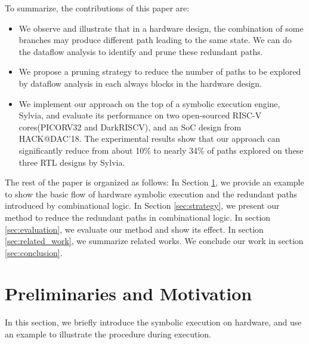 \documentclass[conference]{IEEEtran}
\begin{document}
To summarize, the contributions of this paper are:
\begin{itemize}[itemsep=1pt, topsep=1pt, parsep=0pt,leftmargin=*]

\item We observe and illustrate that in a hardware design, the combination of some branches may produce different path leading to the same state. We can do the dataflow analysis to identify and prune these redundant paths.
\item We propose a pruning strategy to reduce the number of paths to be explored by dataflow analysis in each always blocks in the hardware design.
\item We implement our approach on the top of a symbolic execution engine, Sylvia, and evaluate its performance on two open-sourced RISC-V cores(PICORV32 and DarkRISCV), and an SoC design from HACK@DAC'18. The experimental results show that our approach can significantly reduce from about 10\%  to nearly 34\% of paths explored on these three RTL designs by Sylvia. %
\end{itemize}
The rest of the paper is organized as follows: In Section \ref{sec:motivation}, we provide an example to show the basic flow of hardware symbolic execution and the redundant paths introduced by combinational logic. In Section \ref{sec:strategy}, we present our method to reduce the redundant paths in combinational logic. In section \ref{sec:evaluation}, we evaluate our method and show its effect. In section \ref{sec:related_work}, we summarize related works. We conclude our work in section \ref{sec:conclusion}.

\section{Preliminaries and Motivation}
\label{sec:motivation}

In this section, we briefly introduce the symbolic execution on hardware, and use an example to illustrate the procedure during execution.
\end{document}

